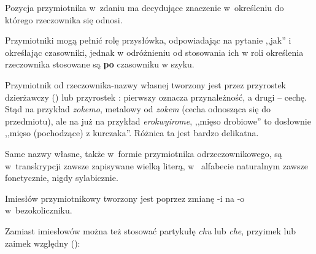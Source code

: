 Pozycja przymiotnika w~zdaniu ma decydujące znaczenie w~określeniu do którego
rzeczownika się odnosi.




Przymiotniki mogą pełnić rolę przysłówka, odpowiadając na pytanie ,,jak'' i
określając czasowniki, jednak w odróżnieniu od stosowania ich w roli określenia
rzeczownika stosowane są \textbf{po} czasowniku w szyku.


Przymiotnik od rzeczownika-nazwy własnej tworzony jest przez przyrostek
dzierżawczy  () lub przyrostek : pierwszy oznacza
przynależność, a drugi -- cechę. Stąd na przykład \emph{zokemo}, metalowy od
\emph{zokem} (cecha odnosząca się do przedmiotu), ale na już na przykład
\emph{erokwyirome}, ,,mięso drobiowe'' to dosłownie ,,mięso (pochodzące) z
kurczaka''. Różnica ta jest bardzo delikatna.

Same nazwy własne, także w~formie przymiotnika odrzeczownikowego, są
w~transkrypcji zawsze zapisywane wielką literą, w~ alfabecie naturalnym zawsze
fonetycznie, nigdy sylabicznie.

Imiesłów przymiotnikowy tworzony jest poprzez zmianę -i na -o w~bezokoliczniku.



Zamiast imiesłowów można też stosować partykułę \emph{chu} lub \emph{che},
przyimek lub zaimek względny (\Rel{}):


